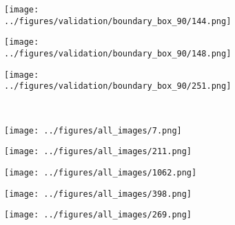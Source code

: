 \begin{figure}[h!]
	\begin{subfigure}{0.18\textwidth}
		\centering
		\texttt{[image: ../figures/validation/boundary\_box\_90/144.png]}
		\label{fig:1}
	\end{subfigure}
	\begin{subfigure}{0.18\textwidth}
		\centering
		\texttt{[image: ../figures/validation/boundary\_box\_90/148.png]}
		\label{fig:1}
	\end{subfigure}
	\begin{subfigure}{0.18\textwidth}
		\centering
		\texttt{[image: ../figures/validation/boundary\_box\_90/251.png]}
		\label{fig:1}
	\end{subfigure}
	\vspace{-0.35cm}
	\\
		\begin{subfigure}[b]{0.03\textwidth} %
		\centering
	\end{subfigure}
	\hspace{0.05cm}
	\begin{subfigure}{0.18\textwidth}
		\centering
		\texttt{[image: ../figures/all\_images/7.png]}
		\label{fig:1}
	\end{subfigure}
	\begin{subfigure}{0.18\textwidth}
		\centering
		\texttt{[image: ../figures/all\_images/211.png]}
		\label{fig:1}
	\end{subfigure}
	\begin{subfigure}{0.18\textwidth}
		\centering
		\texttt{[image: ../figures/all\_images/1062.png]}
		\label{fig:1}
	\end{subfigure}
	\begin{subfigure}{0.18\textwidth}
		\centering
		\texttt{[image: ../figures/all\_images/398.png]}
		\label{fig:1}
	\end{subfigure}
	\begin{subfigure}{0.18\textwidth}
		\centering
		\texttt{[image: ../figures/all\_images/269.png]}
		\label{fig:1}
	\end{subfigure}
	\vspace{-0.35cm}
	\\
		\begin{subfigure}[b]{0.03\textwidth} %
		\centering
	\end{subfigure}

\end{figure}
